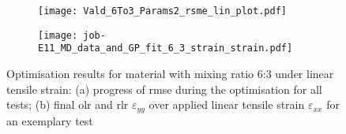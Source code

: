 \begin{figure}[H]
\centering
\begin{subfigure}[t]{0.495\textwidth}
    \centering
    \texttt{[image: Vald\_6To3\_Params2\_rsme\_lin\_plot.pdf]}
    \caption{}
    \label{fig:verifRMSEProgress}
\end{subfigure}
\hfill
\begin{subfigure}[t]{0.495\textwidth}
    \centering
    \centering
    \texttt{[image: job-E11\_MD\_data\_and\_GP\_fit\_6\_3\_strain\_strain.pdf]}
    \caption{}
    \label{fig:verfiStrainStrain}
\end{subfigure}
\caption{Optimisation results for material with mixing ratio 6:3 under linear tensile strain: (a) progress of \acrfull{rmse} during the optimisation for all tests; (b) final \acrlong{olr} and \acrfull{rlr} $\varepsilon_{yy}$ over applied linear tensile strain $\varepsilon_{xx}$ for an exemplary test}
\label{fig:verifRmseStrainstrain}
\end{figure}

